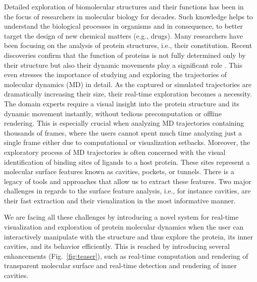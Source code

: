 
Detailed exploration of biomolecular structures and their functions has been in the focus of researchers in molecular biology for decades.
Such knowledge helps to understand the biological processes in organisms and in consequence, to better target the design of new chemical matters (e.g., drugs).
Many researchers have been focusing on the analysis of protein structures, i.e., their constitution. 
Recent discoveries confirm that the function of proteins is not fully determined only by their structure but also their dynamic movements play a significant role \cite{Hensen2012}.
This even stresses the importance of studying and exploring the trajectories of molecular dynamics (MD) in detail. 
As the captured or simulated trajectories are dramatically increasing their size, their real-time exploration becomes a necessity. 
The domain experts require a visual insight into the protein structure and its dynamic movement instantly, without tedious precomputation or offline rendering.
This is especially crucial when analyzing MD trajectories containing thousands of frames, where the users cannot spent much time analyzing just a single frame either due to computational or visualization setbacks. 
Moreover, the exploratory process of MD trajectories is often concerned with the visual identification of binding sites of ligands to a host protein.
These sites represent a molecular surface features known as cavities, pockets, or tunnels.
There is a legacy of tools and approaches that allow us to extract these features.
Two major challenges in regards to the surface feature analysis, i.e., for instance cavities, are their fast extraction and their visualization in the most informative manner. 

We are facing all these challenges by introducing a novel system for real-time visualization and exploration of protein molecular dynamics when the user can interactively manipulate with the structure and thus explore the protein, its inner cavities, and its behavior efficiently. 
This is reached by introducing several enhancements (Fig.~\ref{fig:teaser}), such as real-time computation and rendering of transparent molecular surface and real-time detection and rendering of inner cavities.


